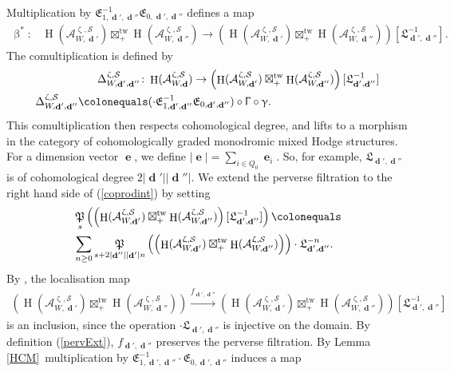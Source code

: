 \documentclass[a4paper,10pt]{amsart}
\renewcommand{\beta}{\upbeta}
\renewcommand{\gamma}{\upgamma}
\renewcommand{\zeta}{\upzeta}
\renewcommand{\Gamma}{\Upgamma}
\DeclareMathOperator{\Pf}{\mathfrak{P}}
\newcommand{\SP}{\mathcal{S}}
\DeclareMathOperator{\tw}{tw}
\DeclareMathOperator{\dd}{\mathbf{d}}
\DeclareMathOperator{\ee}{\mathbf{e}}
\DeclareMathOperator{\HO}{H}
\begin{document}
Multiplication by $\mathfrak{E}^{-1}_{1,\dd',\dd''}\mathfrak{E}_{0,\dd',\dd''}$ defines a map
\begin{align}
\beta^*\colon &\HO(\mathcal{A}^{\zeta,\SP}_{W,\dd'})\boxtimes_+^{\tw}\HO(\mathcal{A}^{\zeta,\SP}_{W,\dd''})\rightarrow   \left(\HO(\mathcal{A}^{\zeta,\SP}_{W,\dd'})\boxtimes_+^{\tw}\HO(\mathcal{A}^{\zeta,\SP}_{W,\dd''})\right)[\mathfrak{L}^{-1}_{\dd',\dd''}].
\end{align}
The comultiplication is defined \cite[Cor.5.9]{Da13} by
\begin{align*} \Delta_{W,\dd',\dd''}^{\zeta,\SP}\colon &\HO(\mathcal{A}_{W,\dd}^{\zeta,\SP})\rightarrow \left(\HO(\mathcal{A}_{W,\dd'}^{\zeta,\SP})\boxtimes^{\tw}_+ \HO(\mathcal{A}_{W,\dd''}^{\zeta,\SP})\right)[\mathfrak{L}^{-1}_{\dd',\dd''}]
\\ 
\Delta_{W,\dd',\dd''}^{\zeta,\SP}\colonequals &(\cdot\mathfrak{E}^{-1}_{1,\dd',\dd''}\mathfrak{E}_{0,\dd',\dd''})\circ \Gamma\circ\gamma.  
\end{align*}
This comultiplication then respects cohomological degree, and lifts to a morphism in the category of cohomologically graded monodromic mixed Hodge structures.  For a dimension vector $\ee$, we define $\lvert \ee\rvert=\sum_{i\in Q_0}\ee_i$.  So, for example, $\mathfrak{L}_{\dd',\dd''}$ is of cohomological degree $2\lvert\dd'\rvert \lvert \dd''\rvert$.  We extend the perverse filtration to the right hand side of (\ref{coprodint}) by setting 
\begin{align}\label{pervExt}
&\Pf_{s}\left(\left(\HO(\mathcal{A}_{W,\dd'}^{\zeta,\SP})\boxtimes^{\tw}_+ \HO(\mathcal{A}_{W,\dd''}^{\zeta,\SP})\right)[\mathfrak{L}^{-1}_{\dd',\dd''}]\right)\colonequals\\&\sum_{n\geq 0}\Pf_{s+2\lvert\dd''\rvert\lvert\dd'\rvert n}\left(\left(\HO(\mathcal{A}_{W,\dd'}^{\zeta,\SP})\boxtimes^{\tw}_+ \HO(\mathcal{A}_{W,\dd''}^{\zeta,\SP})\right)\right)\cdot \mathfrak{L}_{\dd',\dd''}^{-n}.\nonumber
\end{align}
By \cite[Prop.4.1]{Da13}, the localisation map 
\begin{align}\label{fDef}
\left(\HO(\mathcal{A}_{W,\dd'}^{\zeta,\SP})\boxtimes^{\tw}_+ \HO(\mathcal{A}_{W,\dd''}^{\zeta,\SP})\right)\xrightarrow{f_{\dd',\dd''}} \left(\HO(\mathcal{A}_{W,\dd'}^{\zeta,\SP})\boxtimes^{\tw}_+ \HO(\mathcal{A}_{W,\dd''}^{\zeta,\SP})\right)[\mathfrak{L}^{-1}_{\dd',\dd''}]
\end{align}
is an inclusion, since the operation $\cdot\mathfrak{L}_{\dd',\dd''}$ is injective on the domain.  By definition (\ref{pervExt}), $f_{\dd',\dd''}$ preserves the perverse filtration.  By Lemma \ref{HCM}\, multiplication by $\mathfrak{E}_{1,\dd',\dd''}^{-1}\cdot\mathfrak{E}_{0,\dd',\dd''}$ induces a map
\end{document}
